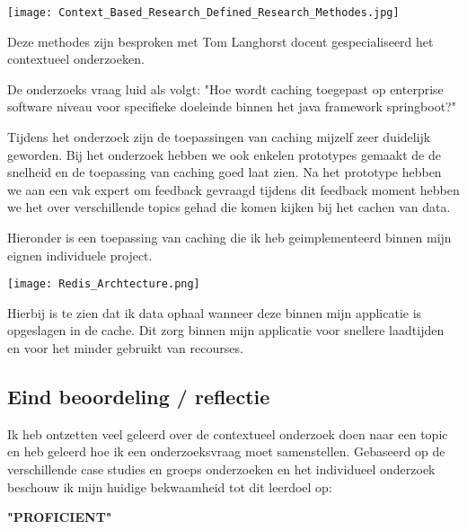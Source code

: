 \texttt{[image: Context\_Based\_Research\_Defined\_Research\_Methodes.jpg]}\label{fig:research_methodes}

Deze methodes zijn besproken met Tom Langhorst docent gespecialiseerd het contextueel onderzoeken.

De onderzoeks vraag luid als volgt: "Hoe wordt caching toegepast op enterprise software niveau voor specifieke doeleinde binnen het java framework springboot?"

Tijdens het onderzoek zijn de toepassingen van caching mijzelf zeer duidelijk geworden.
Bij het onderzoek hebben we ook enkelen prototypes gemaakt de de snelheid en de toepassing van caching goed laat zien.
Na het prototype hebben we aan een vak expert om feedback gevraagd tijdens dit feedback moment hebben we het over verschillende topics gehad die komen kijken bij het cachen van data.

Hieronder is een toepassing van caching die ik heb geimplementeerd binnen mijn eignen individuele project.

\texttt{[image: Redis\_Archtecture.png]}\label{fig:redis_architecture}

Hierbij is te zien dat ik data ophaal wanneer deze binnen mijn applicatie is opgeslagen in de cache.
Dit zorg binnen mijn applicatie voor snellere laadtijden en voor het minder gebruikt van recourses.

\subsection{Eind beoordeling / reflectie}
Ik heb ontzetten veel geleerd over de contextueel onderzoek doen naar een topic en heb geleerd hoe ik een onderzoeksvraag moet samenstellen.
Gebaseerd op de verschillende case studies en groeps onderzoeken en het individueel onderzoek beschouw ik mijn huidige bekwaamheid tot dit leerdoel op:\\
\par\vspace{10pt}\textbf{\uppercase{"Proficient"}}\\

\newpage
